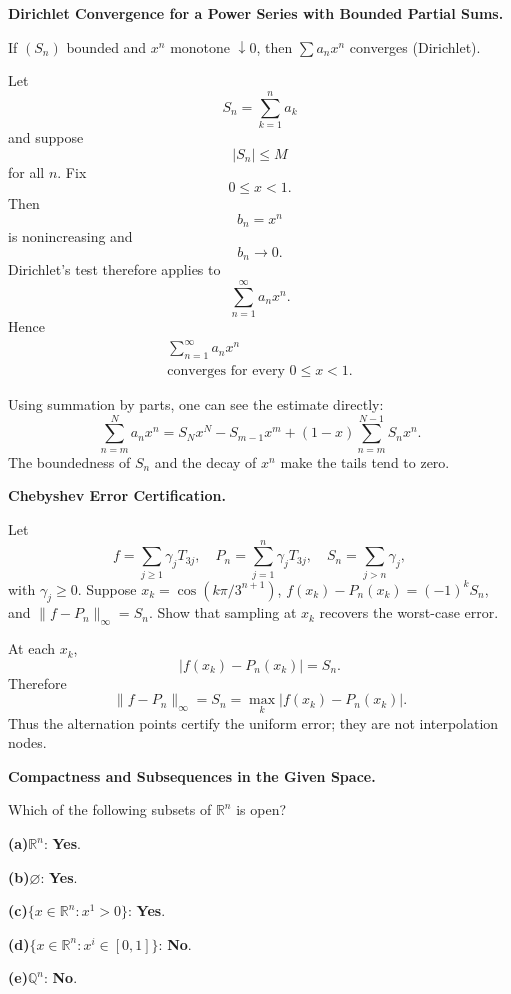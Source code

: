 \begin{problem}[CP-II-0302]
\label{prob:cp-ii-0302}
\textbf{Dirichlet Convergence for a Power Series with Bounded Partial Sums.}

\hspace*{1.5em}If $(S_n)$ bounded and $x^n$ monotone $\downarrow 0$, then $\sum a_n x^n$ converges (Dirichlet).
\end{problem}

\begin{solution}
Let
\[
S_n=\sum_{k=1}^{n}a_k
\]
and suppose
\[
|S_n|\le M
\]
for all \(n\). Fix
\[
0\le x<1.
\]
Then
\[
b_n=x^n
\]
is nonincreasing and
\[
b_n\to0.
\]
Dirichlet's test therefore applies to
\[
\sum_{n=1}^{\infty}a_nx^n.
\]
Hence
\[
\boxed{
\begin{gathered}
\displaystyle \sum_{n=1}^{\infty}a_nx^n\\[-1mm]
\text{converges for every }0\le x<1.
\end{gathered}
}
\]

Using summation by parts, one can see the estimate directly:
\[
\sum_{n=m}^{N}a_nx^n
=
S_Nx^N-S_{m-1}x^m
+
(1-x)\sum_{n=m}^{N-1}S_nx^n.
\]
The boundedness of \(S_n\) and the decay of \(x^n\) make the tails tend to zero.
\end{solution}


\begin{problem}[CP-II-0306]
\label{prob:cp-ii-0306}
\textbf{Chebyshev Error Certification.}

\hspace*{1.5em}Let
\[
f=\sum_{j\ge1}\gamma_jT_{3j},\quad P_n=\sum_{j=1}^n\gamma_jT_{3j},\quad S_n=\sum_{j>n}\gamma_j,
\]
with \(\gamma_j\ge0\). Suppose \(x_k=\cos(k\pi/3^{n+1})\),
\(f(x_k)-P_n(x_k)=(-1)^kS_n\), and \(\|f-P_n\|_\infty=S_n\). Show that sampling at \(x_k\) recovers the worst-case error.
\end{problem}

\begin{solution}
At each \(x_k\),
\[
|f(x_k)-P_n(x_k)|=S_n.
\]
Therefore
\[
\boxed{\|f-P_n\|_\infty=S_n=\max_k|f(x_k)-P_n(x_k)|.}
\]
Thus the alternation points certify the uniform error; they are not interpolation nodes.
\end{solution}


\begin{problem}[CP-II-0307]
\label{prob:cp-ii-0307}
\textbf{Compactness and Subsequences in the Given Space.}

\hspace*{1.5em}Which of the following subsets of $\mathbb{R}^n$ is open?

\renewcommand\labelenumi{(\alph{enumi})}
\par\smallskip\noindent\textbf{(a)}\quad $\mathbb{R}^n$: \textbf{Yes}.
\par\smallskip\noindent\textbf{(b)}\quad $\varnothing$: \textbf{Yes}.
\par\smallskip\noindent\textbf{(c)}\quad $\{x\in\mathbb{R}^n:x^1>0\}$: \textbf{Yes}.
\par\smallskip\noindent\textbf{(d)}\quad $\{x\in\mathbb{R}^n:x^i\in[0,1]\}$: \textbf{No}.
\par\smallskip\noindent\textbf{(e)}\quad $\mathbb{Q}^n$: \textbf{No}.
\end{problem}

